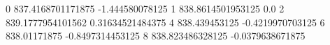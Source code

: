0 837.4168701171875 -1.444580078125
1 838.8614501953125 0.0
2 839.1777954101562 0.31634521484375
4 838.439453125 -0.4219970703125
6 838.01171875 -0.8497314453125
8 838.823486328125 -0.0379638671875
